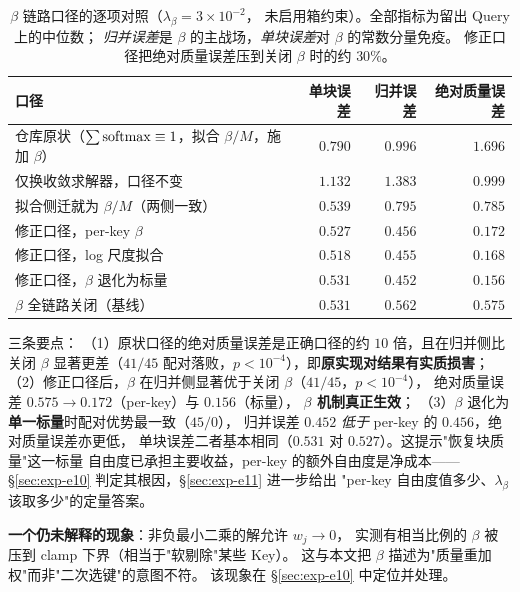 \begin{table}[t]
  \centering
  \small
  \setlength{\tabcolsep}{4pt}
  \begin{tabular}{p{}rrr}
    \toprule
    口径 & 单块误差 & 归并误差 & 绝对质量误差 \\
    \midrule
    仓库原状（$\sum\mathrm{softmax}\equiv 1$，拟合 $\beta/M$，施加 $\beta$）
        & $0.790$ & $0.996$ & $1.696$ \\
    仅换收敛求解器，口径不变 & $1.132$ & $1.383$ & $0.999$ \\
    拟合侧迁就为 $\beta/M$（两侧一致） & $0.539$ & $0.795$ & $0.785$ \\
    \midrule
    修正口径，per-key $\beta$ & $0.527$ & $0.456$ & $0.172$ \\
    修正口径，log 尺度拟合 & $0.518$ & $0.455$ & $0.168$ \\
    修正口径，$\beta$ 退化为标量 & $0.531$ & $\mathbf{0.452}$ & $\mathbf{0.156}$ \\
    \midrule
    $\beta$ 全链路关闭（基线） & $0.531$ & $0.562$ & $0.575$ \\
    \bottomrule
  \end{tabular}
  \caption{$\beta$ 链路口径的逐项对照（$\lambda_\beta=3\times10^{-2}$，
  未启用箱约束）。全部指标为留出 Query 上的中位数；
  \emph{归并误差}是 $\beta$ 的主战场，\emph{单块误差}对 $\beta$ 的常数分量免疫。
  修正口径把绝对质量误差压到关闭 $\beta$ 时的约 $30\%$。}
  \label{tab:beta-convention}
\end{table}

三条要点：
（1）原状口径的绝对质量误差是正确口径的约 $10$ 倍，且在归并侧比关闭 $\beta$
显著更差（$41/45$ 配对落败，$p<10^{-4}$），即\textbf{原实现对结果有实质损害}；
（2）修正口径后，$\beta$ 在归并侧显著优于关闭 $\beta$（$41/45$，$p<10^{-4}$），
绝对质量误差 $0.575 \to 0.172$（per-key）与 $0.156$（标量），
\textbf{$\beta$ 机制真正生效}；
（3）$\beta$ 退化为\textbf{单一标量}时配对优势最一致（$45/0$），
归并误差 $0.452$ \emph{低于} per-key 的 $0.456$，绝对质量误差亦更低，
单块误差二者基本相同（$0.531$ 对 $0.527$）。这提示"恢复块质量"这一标量
自由度已承担主要收益，per-key 的额外自由度是净成本——
\S\ref{sec:exp-e10} 判定其根因，\S\ref{sec:exp-e11} 进一步给出
"per-key 自由度值多少、$\lambda_\beta$ 该取多少"的定量答案。

\textbf{一个仍未解释的现象}：非负最小二乘的解允许 $w_j \to 0$，
实测有相当比例的 $\beta$ 被压到 clamp 下界（相当于"软剔除"某些 Key）。
这与本文把 $\beta$ 描述为"质量重加权"而非"二次选键"的意图不符。
该现象在 \S\ref{sec:exp-e10} 中定位并处理。

